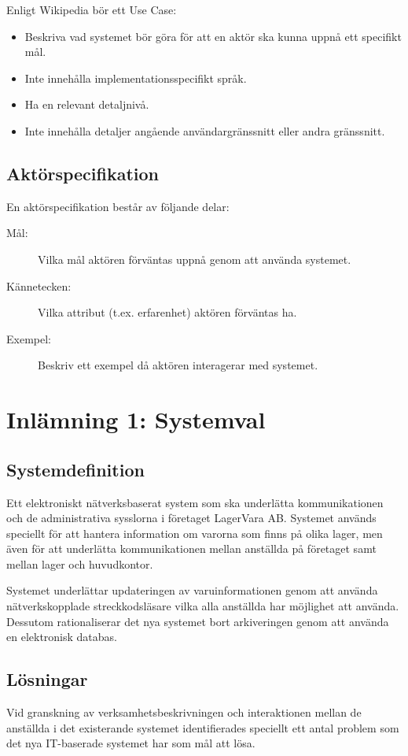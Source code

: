 \documentclass[a4paper,12pt]{article}
\begin{document}
Enligt Wikipedia bör ett Use Case:
\begin{itemize}
\item Beskriva vad systemet bör göra för att en aktör ska kunna uppnå ett specifikt mål.
\item Inte innehålla implementationsspecifikt språk.
\item Ha en relevant detaljnivå.
\item Inte innehålla detaljer angående användargränssnitt eller andra gränssnitt.
\end{itemize}

\subsection{\textsf{Aktörspecifikation}}
En aktörspecifikation består av följande delar:

\begin{description}
\item[Mål:] Vilka mål aktören förväntas uppnå genom att använda systemet.
\item[Kännetecken:] Vilka attribut (t.ex. erfarenhet) aktören förväntas ha.
\item[Exempel:] Beskriv ett exempel då aktören interagerar med systemet.
\end{description}

\newpage
\section{\textsf{Inlämning 1: Systemval}}
\subsection{\textsf{Systemdefinition}}
Ett elektroniskt nätverksbaserat system som ska underlätta kommunikationen och de administrativa sysslorna i företaget LagerVara AB. Systemet används speciellt för att hantera information om varorna som finns på olika lager, men även för att underlätta kommunikationen mellan anställda på företaget samt mellan lager och huvudkontor.

Systemet underlättar updateringen av varuinformationen genom att använda nätverkskopplade streckkodsläsare vilka alla anställda har möjlighet att använda. Dessutom rationaliserar det nya systemet bort arkiveringen genom att använda en elektronisk databas.

\subsection{\textsf{Lösningar}}
Vid granskning av verksamhetsbeskrivningen och interaktionen mellan de anställda i det existerande systemet identifierades speciellt ett antal problem som det nya IT-baserade systemet har som mål att lösa.
\end{document}
